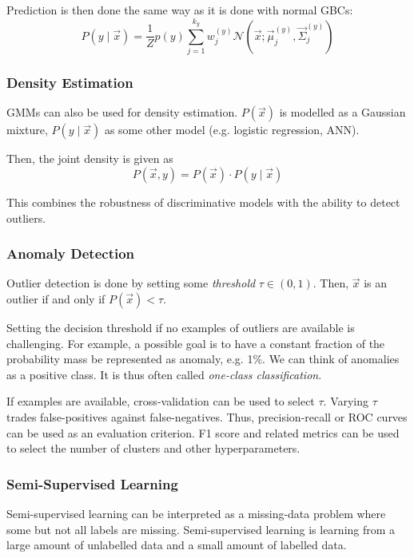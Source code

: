 Prediction is then done the same way
as it is done with normal GBCs:
\begin{equation*}
    P(y \mid \vec{x}) = \frac{1}{Z}
    p(y) \sum_{j = 1}^{k_y}{
        w_j^{(y)}
        \mathcal{N}(\vec{x}; \vec{\mu}_j^{(y)}, \vec{\Sigma}_j^{(y)})
    }
\end{equation*}

\subsubsection{Density Estimation}
GMMs can also be used for density estimation.
$P(\vec{x})$ is modelled as a Gaussian mixture,
$P(y \mid \vec{x})$ as some other model
(e.g. logistic regression, ANN).

Then, the joint density is given as
\begin{equation*}
    P(\vec{x}, y) = P(\vec{x}) \cdot P(y \mid \vec{x})
\end{equation*}

This combines the robustness of
discriminative models with the
ability to detect outliers.

\subsubsection{Anomaly Detection}
Outlier detection is done by setting some
\emph{threshold} $\tau \in (0, 1)$.
Then, $\vec{x}$ is an outlier if
and only if
$P(\vec{x}) < \tau$.

Setting the decision threshold if no
examples of outliers are available
is challenging.
For example,
a possible goal is to have a constant
fraction of the probability mass
be represented as anomaly, e.g. 1\%.
We can think of anomalies as a positive class.
It is thus often called \emph{one-class classification}.

If examples are available,
cross-validation can be used
to select $\tau$.
Varying $\tau$ trades false-positives
against false-negatives.
Thus, precision-recall or ROC curves
can be used as an evaluation criterion.
F1 score and related metrics can
be used to select the number of clusters
and other hyperparameters.

\subsubsection{Semi-Supervised Learning}
Semi-supervised learning can be interpreted
as a missing-data problem where
some but not all labels are missing.
Semi-supervised learning is learning
from a large amount of unlabelled data and
a small amount of labelled data.

